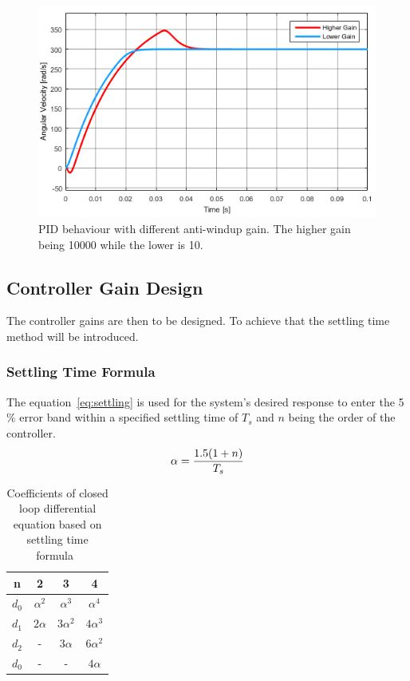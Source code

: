 \begin{figure}[!h]
	\centering
	\includegraphics[width=.6\linewidth]{graphics/pidwindupvaluecomp}
	\caption{PID behaviour with different anti-windup gain. The higher gain being 10000 while the lower is 10.}
	\label{fig:pidwindupvaluecomp}
\end{figure}

\subsection{Controller Gain Design}
The controller gains are then to be designed. To achieve that the settling time method will be introduced.


\subsubsection{Settling Time Formula}

The equation~\ref{eq:settling} is used for the system's desired response to enter the 5$\%$ error band within a specified settling time of $T_s$ and $n$ being the order of the controller.
\begin{equation}
\centering
\label{eq:settling}
\alpha = \dfrac{1.5(1 + n)}{T_s}
\end{equation}

\begin{table}[!h]
	\caption{ Coefficients of
		closed loop differential
		equation based on settling
		time formula~\cite{feedback}}
	\centering
	\begin{tabular}{|c|c|c|c|}
		\hline
		n & 2 & 3 & 4\\
		\hline
		$d_0$ & $\alpha^2$ & $\alpha^3$ & $\alpha^4$\\ 
		$d_1$ & $2\alpha$ & $3\alpha^2$ & $4\alpha^3$\\
		$d_2$ & - & $3\alpha$ & $6\alpha^2$\\
		$d_0$ & - & - & $4\alpha$\\
		\hline	
		
	\end{tabular}
	\label{table:coefsettlingtime}
\end{table}


